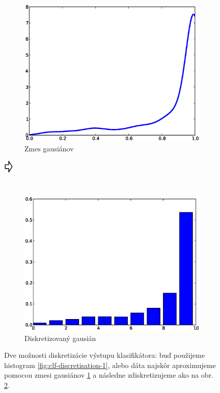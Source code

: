 \begin{figure}[htp]
\begin{subfigure}[c]{0.3\textwidth}
                \includegraphics[width=\textwidth]{images/hist2}
                \caption{Zmes gausiánov}
                \label{fig:clf-discretisation-2}
        \end{subfigure}
        $\vcenter{\hbox{\raisebox{.8cm}{\Huge\pointer}}}$
        \begin{subfigure}[c]{0.3\textwidth}
                \includegraphics[width=\textwidth]{images/hist3}
                \caption{Diskretizovaný gausián}
                \label{fig:clf-discretisation-3}
        \end{subfigure}
        \caption[Diskretizácia výstupu klasifikátora]{Dve možnosti diskretizácie výstupu klasifikátora: buď použijeme histogram \ref{fig:clf-discretisation-1}, alebo dáta najskôr aproximujeme pomocou zmesi gausiánov \ref{fig:clf-discretisation-2} a následne zdiskretizujeme ako na obr. \ref{fig:clf-discretisation-3}.}
        \label{fig:clf-discretisation}
\end{figure}

